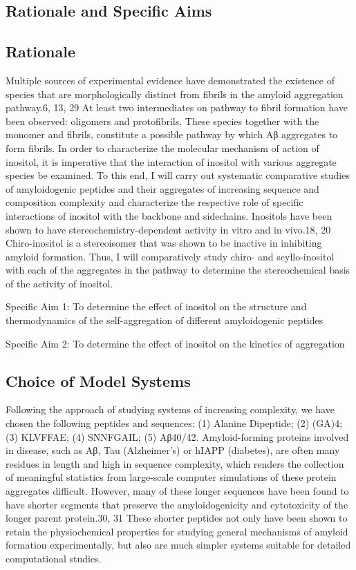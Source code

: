 \subsection{Rationale and Specific Aims}
\subsection{Rationale}
	Multiple sources of experimental evidence have demonstrated the existence of species that are morphologically distinct from fibrils in the amyloid aggregation pathway.6, 13, 29  At least two intermediates on pathway to fibril formation have been observed: oligomers and protofibrils. These species together with the monomer and fibrils, constitute a possible pathway by which Aβ aggregates to form fibrils.  
	In order to characterize the molecular mechanism of action of inositol, it is imperative that the interaction of inositol with various aggregate species be examined.  To this end, I will carry out systematic comparative studies of amyloidogenic peptides and their aggregates of increasing sequence and composition complexity and characterize the respective role of specific interactions of inositol with the backbone and sidechains.  Inositols have been shown to have stereochemistry-dependent activity in vitro and in vivo.18, 20  Chiro-inositol is a stereoisomer that was shown to be inactive in inhibiting amyloid formation.  Thus, I will comparatively study chiro- and scyllo-inositol with each of the aggregates in the pathway to determine the stereochemical basis of the activity of inositol.

Specific Aim 1: To determine the effect of inositol on the structure and thermodynamics of the self-aggregation of different amyloidogenic peptides 

Specific Aim 2: To determine the effect of inositol on the kinetics of aggregation

\subsection{Choice of Model Systems}
Following the approach of studying systems of increasing complexity, we have chosen the following peptides and sequences: (1) Alanine Dipeptide; (2) (GA)4; (3) KLVFFAE; (4) SNNFGAIL; (5) Aβ40/42.  Amyloid-forming proteins involved in disease, such as Aβ, Tau (Alzheimer's) or hIAPP (diabetes), are often many residues in length and high in sequence complexity, which renders the collection of meaningful statistics from large-scale computer simulations of these protein aggregates difficult.  However, many of these longer sequences have been found to have shorter segments that preserve the amyloidogenicity and cytotoxicity of the longer parent protein.30, 31 These shorter peptides not only have been shown to retain the physiochemical properties for studying general mechanisms of amyloid formation experimentally, but also are much simpler systems suitable for detailed computational studies.

